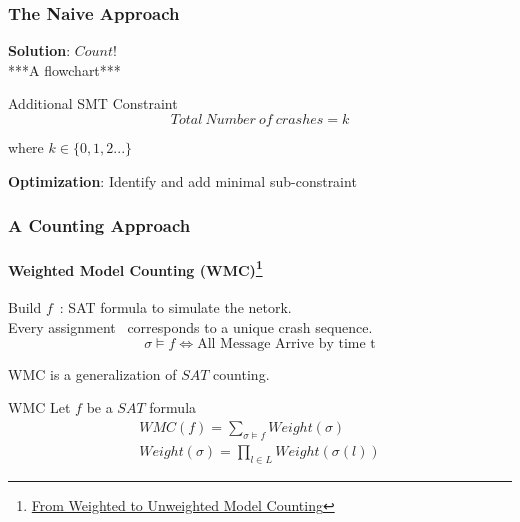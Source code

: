 \documentclass{beamer}
\begin{document}

\begin{frame}
\frametitle{The Naive Approach}
	\textbf{Solution}: $Count!\ $\\
	\pause
	***A flowchart***\\[3ex]
	\pause
	\begin{block}{Additional SMT Constraint}
	\begin{equation}
		Total\ Number\ of\ crashes = k
	\end{equation} 
	\begin{flushright}
		where $k\in\{0,1,2...\}$
	\end{flushright}
	\end{block}
	\pause
	\textbf{Optimization}: 
	Identify and add minimal sub-constraint
\end{frame}


\begin{frame}
\frametitle{A Counting Approach}
\framesubtitle{Weighted Model Counting (WMC)\footnote{\href{http://ijcai.org/Proceedings/15/Papers/103.pdf}{From Weighted to Unweighted Model Counting}}}
	Build $ f $\ : SAT formula to simulate the netork.\\
	Every assignment \sigma\ corresponds to a unique crash sequence.
	$$\sigma \vDash f \iff \text{All Message Arrive by time t}$$

	WMC is a generalization of $SAT$ counting.\\
	\begin{block}{WMC}
	Let $f$ be a $SAT$ formula
	\begin{eqnarray}
		WMC(f) = \sum_{\sigma \vDash f}Weight(\sigma) \\
		Weight(\sigma) = \prod_{l \in L}{Weight(\sigma(l))}
	\end{eqnarray}	
	\end{block}
\end{frame}
\end{document}
